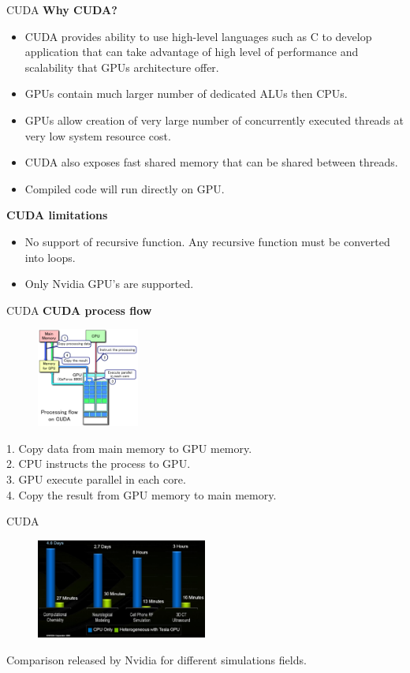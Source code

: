 \documentclass[11pt]{beamer}
\begin{document}
\begin{frame}{CUDA}
\textbf{Why CUDA?}
\begin{itemize}
\item CUDA provides ability to use high-level languages such as C to develop application that can take advantage of high level of performance and scalability that GPUs architecture offer. 
\item GPUs contain much larger number of dedicated ALUs then CPUs.
\item GPUs allow creation of very large number of concurrently executed threads at very low system resource cost.
\item CUDA also exposes fast shared memory that can be shared between threads. 
\item Compiled code will run directly on GPU. 
\end{itemize}
\textbf{CUDA limitations}
\begin{itemize}
\item No support of recursive function. Any recursive function must be converted into loops.
\item Only Nvidia GPU's are supported.
\end{itemize}
\end{frame}

\begin{frame}{CUDA}
\textbf{CUDA process flow}
\begin{figure}[hH]
\includegraphics[width=0.3\textwidth]{images/cuda/cudaflow}
\end{figure}
1. Copy data from main memory to GPU memory.\\
2. CPU instructs the process to GPU.\\
3. GPU execute parallel in each core.\\
4. Copy the result from GPU memory to main memory.

\end{frame}


\begin{frame}{CUDA}
\begin{figure}[hH]
\includegraphics[width=0.5\textwidth]{images/pic1}
\end{figure}
Comparison released by Nvidia for different simulations fields.
\end{frame}
\end{document}
